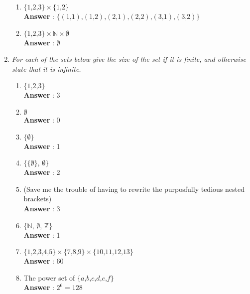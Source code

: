 \documentclass[a4paper,11pt]{article}
\begin{document}
\begin{enumerate}
\begin{enumerate}
  \item \( \lbrace 1 \text{,} 2 \text{,} 3 \rbrace \times \lbrace 1 \text{,} 2 \rbrace  \) \\
  \textbf{Answer} : \( \lbrace
  (1 \text{,} 1) \text{,} 
  (1 \text{,} 2) \text{,} 
  (2 \text{,} 1) \text{,} 
  (2 \text{,} 2) \text{,} 
  (3 \text{,} 1) \text{,} 
  (3 \text{,} 2) 
   \rbrace \)


   \item \( \lbrace 1 \text{,} 2 \text{,} 3 \rbrace \times \mathbb{N} \times \emptyset \) \\
   \textbf{Answer} : \( \emptyset \)

  \end{enumerate}

\item \emph{For each of the sets below give the size of the set if it is finite, and otherwise state that it
is infinite.}
  
  \begin{enumerate}

  \item \( \lbrace 1 \text{,} 2 \text{,} 3 \rbrace \) \\
  \textbf{Answer} : 3
  \item \( \emptyset \)\\
  \textbf{Answer} : 0
  \item \( \lbrace \emptyset \rbrace \) \\
  \textbf{Answer} : 1
  \item \( \lbrace \lbrace \emptyset \rbrace \text{, } \emptyset \rbrace \) \\
  \textbf{Answer} : 2
  \item (Save me the trouble of having to rewrite the purposfully tedious nested brackets) \\
  \textbf{Answer} : 3
  \item \( \lbrace \mathbb{N} \text{, } \emptyset \text{, } \mathbb{Z} \rbrace \) \\
  \textbf{Answer} : 1
  \item \( \lbrace 1 \text{,} 2 \text{,} 3 \text{,} 4 \text{,} 5 \rbrace \times \lbrace 7 \text{,} 8 \text{,} 9 \rbrace \times \lbrace 10 \text{,} 11 \text{,} 12 \text{,} 13 \rbrace  \) \\
  \textbf{Answer} : 60
  \item The power set of \( \lbrace a \text{,} b \text{,} c \text{,} d \text{,} e \text{,} f \rbrace \) \\
  \textbf{Answer} : $2^6 = 128$


\end{enumerate}
\end{enumerate}
\end{document}
